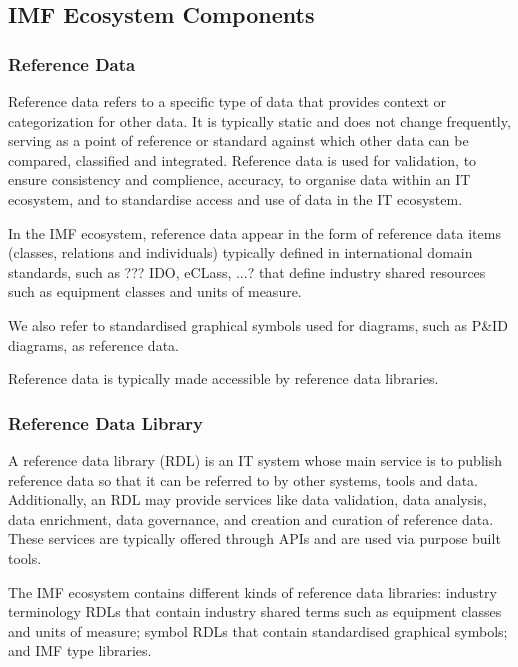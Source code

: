 \subsection{IMF Ecosystem Components}

\subsubsection{Reference Data}
\label{sec:reference-data}

Reference data refers to a specific type of data that provides context
or categorization for other data. It is typically static and does not
change frequently, serving as a point of reference or standard against
which other data can be compared, classified and integrated. Reference
data is used for validation, to ensure consistency and complience,
accuracy, to organise data within an IT ecosystem, and to standardise
access and use of data in the IT ecosystem.

In the IMF ecosystem, reference data appear in the form of reference
data items (classes, relations and individuals) typically defined in
international domain standards, such as ??? IDO, eCLass, ...? that
define industry shared resources such as equipment classes and units of
measure.

We also refer to standardised graphical symbols used for diagrams,
such as P\&ID diagrams, as reference data.

Reference data is typically made accessible by reference data
libraries.


\subsubsection{Reference Data Library}
\label{sec:refer-data-libr}

A reference data library (RDL) is an IT system whose main service is
to publish reference data so that it can be referred to by other systems, tools and
data. 
Additionally, an RDL may provide services like
data validation,
data analysis,
data enrichment,
data governance,
and
creation and curation of reference data.
These services are typically offered through APIs and are used via purpose built tools.

The IMF ecosystem contains different kinds of reference data
libraries:
industry terminology RDLs that contain industry shared terms such as equipment classes and units of measure; 
symbol RDLs that contain standardised graphical symbols;
and
IMF type libraries.


